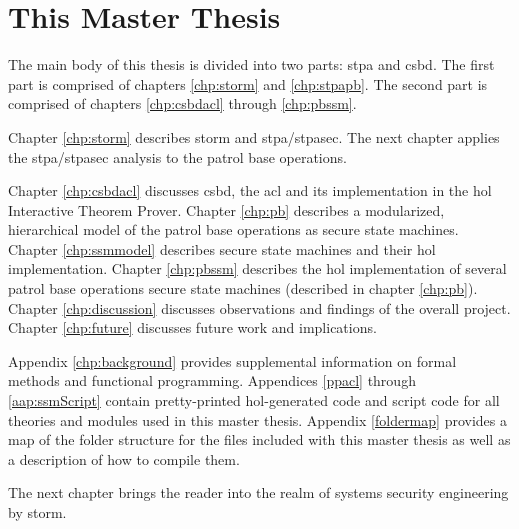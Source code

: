 \documentclass[../../main/main.tex]{subfiles}
\begin{document}
\section{This Master Thesis}\label{sec:thismasterthesis}
The main body of this thesis is divided into two parts: \gls{stpa} and \gls{csbd}. The first part is comprised of chapters \ref{chp:storm} and \ref{chp:stpapb}.  The second part is comprised of chapters \ref{chp:csbdacl} through \ref{chp:pbssm}.


Chapter \ref{chp:storm} describes \gls{storm} and \gls{stpa}/\gls{stpasec}.  The next chapter applies the \gls{stpa}/\gls{stpasec} analysis to the patrol base operations.  

Chapter \ref{chp:csbdacl} discusses \gls{csbd}, the \gls{acl} and its implementation in the \Gls{hol} Interactive Theorem Prover.  Chapter \ref{chp:pb} describes a modularized, hierarchical model of the patrol base operations as secure state machines. Chapter \ref{chp:ssmmodel} describes secure state machines and their \gls{hol} implementation.  Chapter \ref{chp:pbssm} describes the \gls{hol} implementation of several patrol base operations secure state machines (described in chapter \ref{chp:pb}).  Chapter \ref{chp:discussion} discusses observations and findings of the overall project.  Chapter \ref{chp:future} discusses future work and implications. 

Appendix \ref{chp:background} provides supplemental information on formal methods and functional programming.  Appendices \ref{ppacl} through \ref{aap:ssmScript} contain pretty-printed \gls{hol}-generated code and script code for all theories and modules used in this master thesis.  Appendix \ref{foldermap} provides a map of the folder structure for the files included with this master thesis as well as a description of how to compile them.

The next chapter brings the reader into the realm of systems security engineering by \gls{storm}.
\end{document}
